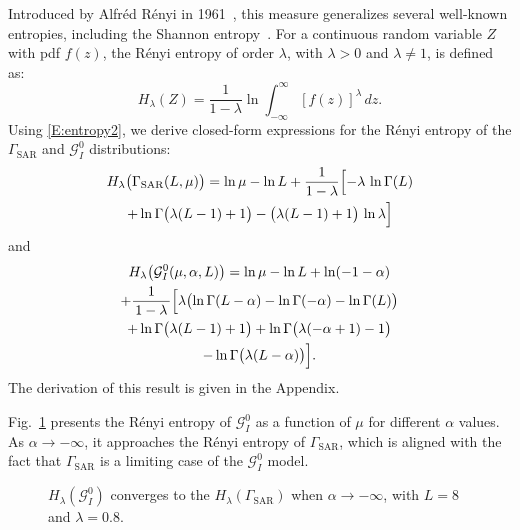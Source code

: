 \documentclass[
  journal,
]{IEEEtran}%
\begin{document}
Introduced by Alfréd Rényi in
1961~, this measure
generalizes several well-known entropies, including the Shannon
entropy~. For a continuous random
variable \(Z\) with pdf \(f(z)\), the Rényi entropy of order
\(\lambda\), with \(\lambda > 0\) and \(\lambda \neq 1\), is defined as:
\begin{equation}
\label{E:entropy2}
H_\lambda(Z) = \frac{1}{1 - \lambda} \ln \int_{-\infty}^{\infty} [f(z)]^\lambda \, dz.
\end{equation} Using \eqref{E:entropy2}, we derive closed-form
expressions for the Rényi entropy of the \(\Gamma_{\mathrm{SAR}}\) and
\(\mathcal{G}^0_I\) distributions: \begin{multline}
\label{eq-HGammaSAR}
H_\lambda\bigl(\Gamma_{\text{SAR}}(L, \mu)\bigr)
= 
\ln \mu - \ln L + \frac{1}{1-\lambda}
\Bigl[
  -\lambda\,\ln\Gamma(L) \\  + \ln\Gamma\bigl(\lambda(L-1)+1\bigr)  - \bigl(\lambda(L-1)+1\bigr)\,\ln\lambda
\Bigr]
\end{multline} and \begin{multline}\label{eq-HGI0}
H_\lambda\bigl(\mathcal{G}^0_I(\mu, \alpha, L)\bigr)=\ln\mu-\ln L +\ln(-1 - \alpha)\\
+ \frac{1}{\,1 - \lambda\,}
\Bigl[
   \lambda\bigl(
      \ln\Gamma(L - \alpha)
      -\ln\Gamma(-\alpha)
      -\ln\Gamma(L)
   \bigr)\\
   +\ln\Gamma\bigl(\lambda(L - 1) + 1\bigr)
   +\ln\Gamma\bigl(\lambda(-\alpha + 1) - 1\bigr)\\
   -\ln\Gamma\bigl(\lambda(L - \alpha)\bigr)
\Bigr].
\end{multline} The derivation of this result is given in the Appendix.

Fig.~\ref{fig-plot} presents the Rényi entropy of \(\mathcal{G}^0_I\) as
a function of \(\mu\) for different \(\alpha\) values. As
\(\alpha \to -\infty\), it approaches the Rényi entropy of
\(\Gamma_{\text{SAR}}\), which is aligned with the fact that
\(\Gamma_{\text{SAR}}\) is a limiting case of the \(\mathcal{G}^0_I\)
model.

\begin{figure}[hbt]


\caption{\label{fig-plot}\(H_{\lambda}(\mathcal{G}^0_I)\) converges to
the \(H_{\lambda}(\Gamma_{\text{SAR}})\) when \(\alpha\to-\infty\), with
\(L=8\) and \(\lambda=0.8\).}

\end{figure}%
\end{document}
